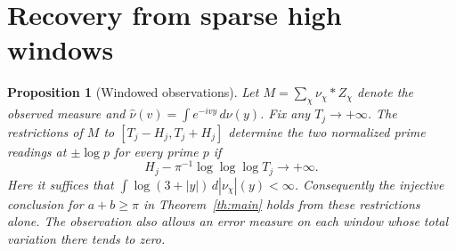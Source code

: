\documentclass[11pt]{article}
\newtheorem{proposition}[theorem]{Proposition}
\begin{document}
\section{Recovery from sparse high windows}\label{sec:windows}
\begin{proposition}[Windowed observations]\label{pr:win}
Let $M=\sum_\chi\nu_\chi*Z_\chi$ denote the observed measure and
$\widehat\nu(v)=\int e^{-ivy}\,d\nu(y)$. Fix any $T_j\to+\infty$.
The restrictions of $M$ to $[T_j-H_j,T_j+H_j]$ determine the two normalized prime readings at $\pm\log p$ for every prime $p$ if
\[
 H_j-\pi^{-1}\log\log\log T_j\longrightarrow+\infty.
\]
Here it suffices that $\int\log(3+|y|)\,d|\nu_\chi|(y)<\infty$.
Consequently the injective conclusion for \(a+b\ge\pi\) in Theorem~\ref{th:main} holds from these restrictions alone. The observation also allows an error measure on each window whose
total variation there tends to zero.

\end{proposition}
\end{document}
